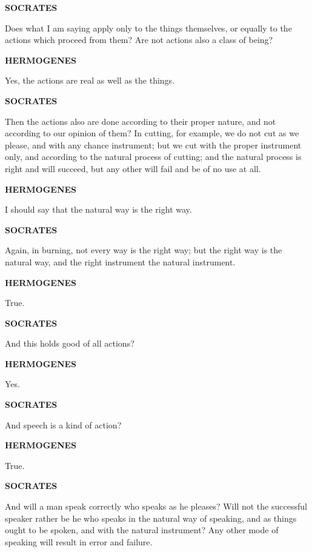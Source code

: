 \documentclass[11pt,letter]{article}
\begin{document}
\par \textbf{SOCRATES}
\par   Does what I am saying apply only to the things themselves, or equally to the actions which proceed from them? Are not actions also a class of being?

\par \textbf{HERMOGENES}
\par   Yes, the actions are real as well as the things.

\par \textbf{SOCRATES}
\par   Then the actions also are done according to their proper nature, and not according to our opinion of them? In cutting, for example, we do not cut as we please, and with any chance instrument; but we cut with the proper instrument only, and according to the natural process of cutting; and the natural process is right and will succeed, but any other will fail and be of no use at all.

\par \textbf{HERMOGENES}
\par   I should say that the natural way is the right way.

\par \textbf{SOCRATES}
\par   Again, in burning, not every way is the right way; but the right way is the natural way, and the right instrument the natural instrument.

\par \textbf{HERMOGENES}
\par   True.

\par \textbf{SOCRATES}
\par   And this holds good of all actions?

\par \textbf{HERMOGENES}
\par   Yes.

\par \textbf{SOCRATES}
\par   And speech is a kind of action?

\par \textbf{HERMOGENES}
\par   True.

\par \textbf{SOCRATES}
\par   And will a man speak correctly who speaks as he pleases? Will not the successful speaker rather be he who speaks in the natural way of speaking, and as things ought to be spoken, and with the natural instrument? Any other mode of speaking will result in error and failure.
\end{document}
